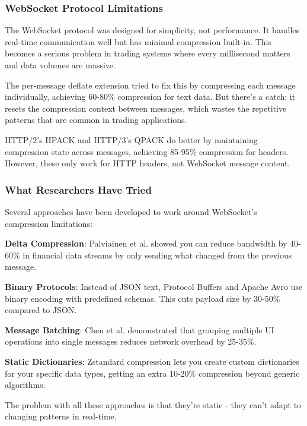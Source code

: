 \documentclass[12pt,a4paper]{article}
\begin{document}
\subsubsection{WebSocket Protocol Limitations}

The WebSocket protocol \cite{rfc6455} was designed for simplicity, not performance. It handles real-time communication well but has minimal compression built-in. This becomes a serious problem in trading systems where every millisecond matters and data volumes are massive.

The per-message deflate extension \cite{rfc7692} tried to fix this by compressing each message individually, achieving 60-80\% compression for text data. But there's a catch: it resets the compression context between messages, which wastes the repetitive patterns that are common in trading applications.

HTTP/2's HPACK \cite{rfc7541} and HTTP/3's QPACK \cite{rfc9204} do better by maintaining compression state across messages, achieving 85-95\% compression for headers. However, these only work for HTTP headers, not WebSocket message content.

\subsubsection{What Researchers Have Tried}

Several approaches have been developed to work around WebSocket's compression limitations:

\textbf{Delta Compression}: Palviainen et al. \cite{palviainen2018websocket} showed you can reduce bandwidth by 40-60\% in financial data streams by only sending what changed from the previous message.

\textbf{Binary Protocols}: Instead of JSON text, Protocol Buffers \cite{protobuf2023} and Apache Avro \cite{avro2023} use binary encoding with predefined schemas. This cuts payload size by 30-50\% compared to JSON.

\textbf{Message Batching}: Chen et al. \cite{chen2019batching} demonstrated that grouping multiple UI operations into single messages reduces network overhead by 25-35\%.

\textbf{Static Dictionaries}: Zstandard compression \cite{zstandard2016} lets you create custom dictionaries for your specific data types, getting an extra 10-20\% compression beyond generic algorithms.

The problem with all these approaches is that they're static - they can't adapt to changing patterns in real-time.
\end{document}
